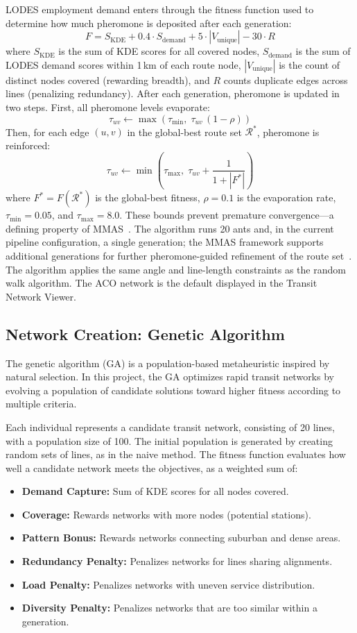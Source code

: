 \documentclass[sigconf,nonacm]{acmart}
\begin{document}
LODES employment demand enters through the fitness function used to determine how much pheromone is deposited after each generation:
\[
  F = S_{\text{KDE}} + 0.4 \cdot S_{\text{demand}} + 5 \cdot |V_{\text{unique}}| - 30 \cdot R
\]
where $S_{\text{KDE}}$ is the sum of KDE scores for all covered nodes, $S_{\text{demand}}$ is the sum of LODES demand scores within 1\,km of each route node, $|V_{\text{unique}}|$ is the count of distinct nodes covered (rewarding breadth), and $R$ counts duplicate edges across lines (penalizing redundancy). After each generation, pheromone is updated in two steps. First, all pheromone levels evaporate:
\[
  \tau_{uv} \leftarrow \max\!\left(\tau_{\min},\; \tau_{uv}\,(1 - \rho)\right)
\]
Then, for each edge $(u,v)$ in the global-best route set $\mathcal{R}^*$, pheromone is reinforced:
\[
  \tau_{uv} \leftarrow \min\!\left(\tau_{\max},\; \tau_{uv} + \frac{1}{1 + |F^*|}\right)
\]
where $F^* = F(\mathcal{R}^*)$ is the global-best fitness, $\rho = 0.1$ is the evaporation rate, $\tau_{\min} = 0.05$, and $\tau_{\max} = 8.0$. These bounds prevent premature convergence---a defining property of MMAS~\cite{stutzle2000mmas}. The algorithm runs 20 ants and, in the current pipeline configuration, a single generation; the MMAS framework supports additional generations for further pheromone-guided refinement of the route set~\cite{stutzle2000mmas}. The algorithm applies the same angle and line-length constraints as the random walk algorithm. The ACO network is the default displayed in the Transit Network Viewer.

\subsection{Network Creation: Genetic Algorithm}
The genetic algorithm (GA) is a population-based metaheuristic inspired by natural selection. In this project, the GA optimizes rapid transit networks by evolving a population of candidate solutions toward higher fitness according to multiple criteria.

Each individual represents a candidate transit network, consisting of 20 lines, with a population size of 100. The initial population is generated by creating random sets of lines, as in the naive method. The fitness function evaluates how well a candidate network meets the objectives, as a weighted sum of:
\begin{itemize}
    \item \textbf{Demand Capture:} Sum of KDE scores for all nodes covered.
    \item \textbf{Coverage:} Rewards networks with more nodes (potential stations).
    \item \textbf{Pattern Bonus:} Rewards networks connecting suburban and dense areas.
    \item \textbf{Redundancy Penalty:} Penalizes networks for lines sharing alignments.
    \item \textbf{Load Penalty:} Penalizes networks with uneven service distribution.
    \item \textbf{Diversity Penalty:} Penalizes networks that are too similar within a generation.
\end{itemize}
\end{document}
